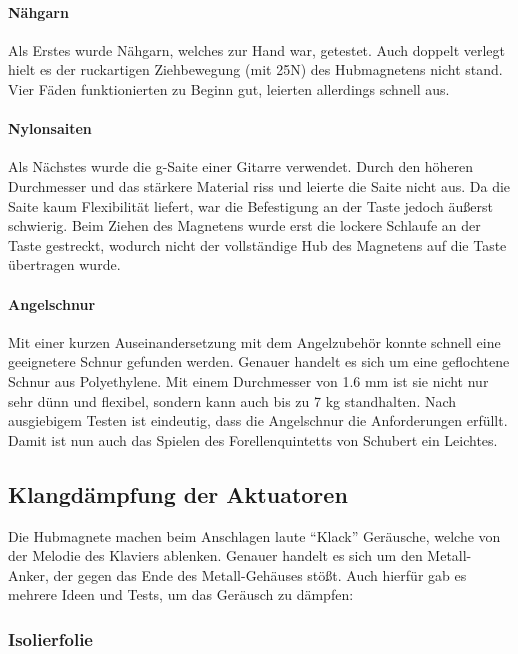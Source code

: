 \paragraph{Nähgarn}

Als Erstes wurde Nähgarn, welches zur Hand war, getestet.
Auch doppelt verlegt hielt es der ruckartigen Ziehbewegung (mit 25N) des Hubmagnetens nicht stand.
Vier Fäden funktionierten zu Beginn gut, leierten allerdings schnell aus.

\paragraph{Nylonsaiten}

Als Nächstes wurde die g-Saite einer Gitarre verwendet.
Durch den höheren Durchmesser und das stärkere Material riss und leierte die Saite nicht aus.
Da die Saite kaum Flexibilität liefert, war die Befestigung an der Taste jedoch äußerst schwierig.
Beim Ziehen des Magnetens wurde erst die lockere Schlaufe an der Taste gestreckt, wodurch nicht der vollständige Hub des Magnetens auf die Taste übertragen wurde.

\paragraph{Angelschnur}

Mit einer kurzen Auseinandersetzung mit dem Angelzubehör konnte schnell eine geeignetere Schnur gefunden werden.
Genauer handelt es sich um eine geflochtene Schnur aus Polyethylene.
Mit einem Durchmesser von 1.6 mm ist sie nicht nur sehr dünn und flexibel, sondern kann auch bis zu 7 kg standhalten.
Nach ausgiebigem Testen ist eindeutig, dass die Angelschnur die Anforderungen erfüllt.
Damit ist nun auch das Spielen des Forellenquintetts von Schubert ein Leichtes.

\subsection{Klangdämpfung der Aktuatoren}


Die Hubmagnete machen beim Anschlagen laute \enquote{Klack} Geräusche, welche von der Melodie des Klaviers ablenken.
Genauer handelt es sich um den Metall-Anker, der gegen das Ende des Metall-Gehäuses stößt.
Auch hierfür gab es mehrere Ideen und Tests, um das Geräusch zu dämpfen:

\subsubsection{Isolierfolie}

